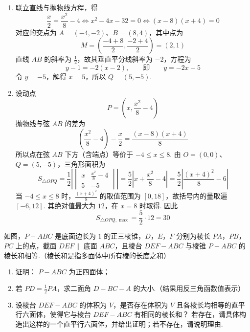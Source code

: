 \begin{solution}
\begin{enumerate}
\item 联立直线与抛物线方程，得
\[
\frac{x}{2}=\frac{x^2}{8}-4
\Longleftrightarrow x^2-4x-32=0
\Longleftrightarrow (x-8)(x+4)=0
\]
对应的交点为 \(A=(-4,-2)\)、\(B=(8,4)\)，其中点为
\[
M=\left(\frac{-4+8}{2},\frac{-2+4}{2}\right)=(2,1)
\]
直线 \(AB\) 的斜率为 \(\frac12\)，故其垂直平分线斜率为 \(-2\)，方程为
\[
y-1=-2(x-2),\qquad\text{即}\qquad y=-2x+5
\]
令 \(y=-5\)，解得 \(x=5\)，所以 \(Q=(5,-5)\).

\item 设动点
\[
P=\left(x,\frac{x^2}{8}-4\right)
\]
抛物线与弦 \(AB\) 的差为
\[
\left(\frac{x^2}{8}-4\right)-\frac{x}{2}
=\frac{(x-8)(x+4)}{8}
\]
所以点在弦 \(AB\) 下方（含端点）等价于 \(-4\leqslant x\leqslant8\). 由 \(O=(0,0)\)、\(Q=(5,-5)\)，三角形面积为
\[
S_{\triangle OPQ}
=\frac12\left|\begin{vmatrix}x&\frac{x^2}{8}-4\\5&-5\end{vmatrix}\right|
=\frac52\left|x+\frac{x^2}{8}-4\right|
=\frac52\left|\frac{(x+4)^2}{8}-6\right|
\]
当 \(-4\leqslant x\leqslant8\) 时，\(\frac{(x+4)^2}{8}\) 的取值范围为 \([0,18]\)，故括号内的量取遍 \([-6,12]\). 其绝对值最大为 \(12\)，在 \(x=8\) 时取得. 因此
\[
S_{\triangle OPQ,\max}=\frac52\cdot12=30
\]
\end{enumerate}
\end{solution}

\begin{problem}
如图，\(P-ABC\) 是底面边长为 \(1\) 的正三棱锥，\(D\)，\(E\)，\(F\) 分别为棱长 \(PA\)，\(PB\)，\(PC\) 上的点，截面 \(DEF \parallel\) 底面 \(ABC\)，且棱台 \(DEF-ABC\) 与棱锥 \(P-ABC\) 的棱长和相等.（棱长和是指多面体中所有棱的长度之和）

\begin{enumerate}
\item 证明： \(P-ABC\) 为正四面体；
\item 若 \(PD = \frac{1}{2}PA\)，求二面角 \(D-BC-A\) 的大小.（结果用反三角函数值表示）
\item 设棱台 \(DEF-ABC\) 的体积为 \(V\)，是否存在体积为 \(V\) 且各棱长均相等的直平行六面体，使得它与棱台 \(DEF-ABC\) 有相同的棱长和？ 若存在，请具体构造出这样的一个直平行六面体，并给出证明；若不存在，请说明理由.
\end{enumerate}

\end{problem}

